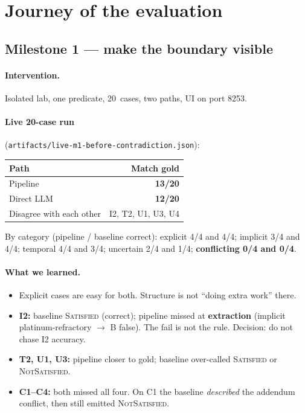 \documentclass[11pt,a4paper]{article}
\newcommand{\sat}{\textsc{Satisfied}}
\newcommand{\nsat}{\textsc{NotSatisfied}}
\begin{document}
\section{Journey of the evaluation}

\subsection{Milestone 1 --- make the boundary visible}

\paragraph{Intervention.}
Isolated lab, one predicate, 20~cases, two paths, UI on port 8253.

\paragraph{Live 20-case run}
(\texttt{artifacts/live-m1-before-contradiction.json}):

\begin{center}
\begin{tabular}{@{}l r@{}}
\toprule
Path & Match gold \\
\midrule
Pipeline & \textbf{13/20} \\
Direct LLM & \textbf{12/20} \\
Disagree with each other & I2, T2, U1, U3, U4 \\
\bottomrule
\end{tabular}
\end{center}

By category (pipeline / baseline correct): explicit 4/4 and 4/4; implicit 3/4 and 4/4; temporal 4/4 and 3/4; uncertain 2/4 and 1/4; \textbf{conflicting 0/4 and 0/4}.

\paragraph{What we learned.}
\begin{itemize}
  \item Explicit cases are easy for both. Structure is not ``doing extra work'' there.
  \item \textbf{I2:} baseline \sat{} (correct); pipeline missed at \textbf{extraction} (implicit platinum-refractory $\rightarrow$ B false). The fail is not the rule. Decision: do not chase I2 accuracy.
  \item \textbf{T2, U1, U3:} pipeline closer to gold; baseline over-called \sat{} or \nsat.
  \item \textbf{C1--C4:} both missed all four. On C1 the baseline \emph{described} the addendum conflict, then still emitted \nsat.
\end{itemize}
\end{document}
